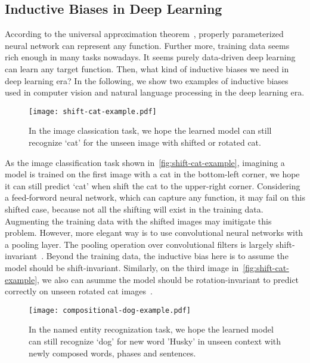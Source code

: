 \subsection{Inductive Biases in Deep Learning}
\label{ssec:intro:bias-source}
According to the universal approximation
theorem~\citep{hornik1989multilayer}, properly parameterized neural
network can represent any function. Further more, training data seems
rich enough in many tasks nowadays. It seems purely data-driven deep
learning can learn any target function. Then, what kind of inductive
biases we need in deep learning era? In the following, we show two
examples of inductive biases used in computer vision and natural
language processing in the deep learning era.

\begin{figure}[!th]
  \centering
  \texttt{[image: shift-cat-example.pdf]}
  \caption{\label{fig:shift-cat-example}In the image classication
    task, we hope the learned model can still recognize `cat' for the
    unseen image with shifted or rotated cat.}
\end{figure}

 As the image classification task shown
in~\autoref{fig:shift-cat-example}, imagining a model is trained on
the first image with a cat in the bottom-left corner, we hope it can
still predict `cat' when shift the cat to the upper-right corner.
Considering a feed-forword neural network, which can capture any
function, it may fail on this shifted case, because not all the
shifting will exist in the training data.  Augmenting the training
data with the shifted images may imitigate this problem. However, more
elegant way is to use convolutional neural networks with a pooling
layer.  The pooling operation over convolutional filters is largely
shift-invariant~\cite{zhang2019making}. Beyond the training data, the
inductive bias here is to assume the model should be shift-invariant.
Similarly, on the third image in~\autoref{fig:shift-cat-example}, we
also can asumme the model should be rotation-invariant to predict
correctly on unseen rotated cat images~\cite{cheng2016rifd}.

\begin{figure}[!th]
  \centering
  \texttt{[image: compositional-dog-example.pdf]}
  \caption{\label{fig:compositional-dog-example}In the named entity
    recognization task, we hope the learned model can still recognize
    `dog' for new word 'Husky' in unseen context with newly composed
    words, phases and sentences.}
\end{figure}


